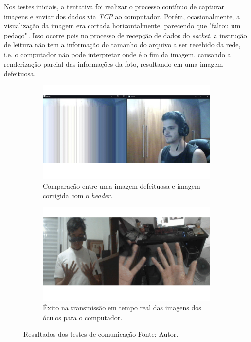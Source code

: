 
Nos testes iniciais, a tentativa foi realizar o processo contínuo de capturar imagens e enviar dos dados via \textit{TCP} ao computador. Porém, ocasionalmente, a visualização da imagem era cortada horizontalmente, parecendo que "faltou um pedaço"\(\,\). Isso ocorre pois no processo de recepção de dados do \textit{socket}, a instrução de leitura não tem a informação do tamanho do arquivo a ser recebido da rede, i.e, o computador não pode interpretar onde é o fim da imagem, causando a renderização parcial das informações da foto, resultando em uma imagem defeituosa.

\begin{figure}[ht]
    \centering
        \begin{subfigure}{.45\textwidth}
            \centering
            \includegraphics[width=.95\linewidth]{figuras/header.png}
    \caption{Comparação entre uma imagem defeituosa e imagem corrigida com o \textit{header}.}
    \label{fig:header}
        \end{subfigure}
        \begin{subfigure}{.45\textwidth}
            \centering
            \includegraphics[width=.95\linewidth]{figuras/comm.png}
            \caption{Êxito na transmissão em tempo real das imagens dos óculos para o computador.}
            \label{fig:communication}
        \end{subfigure}
        \caption{Resultados dos testes de comunicação Fonte: Autor.}
        \label{fig:comm-tests}
\end{figure}

